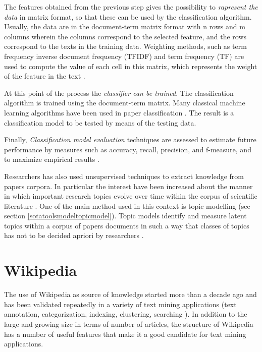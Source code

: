 \documentclass[]{book}
\begin{document}
The features obtained from the previous step gives the possibility to
\emph{rapresent the data} in matrix format, so that these can be used by
the classification algorithm. Usually, the data are in the document-term
matrix format with n rows and m columns wherein the columns correspond
to the selected feature, and the rows correspond to the texts in the
training data. Weighting methods, such as term frequency inverse
document frequency (TFIDF) and term frequency (TF) are used to compute
the value of each cell in this matrix, which represents the weight of
the feature in the text \citep{meyer2008text}.

At this point of the process the \emph{classifier can be trained}. The
classification algorithm is trained using the document-term matrix. Many
classical machine learning algorithms have been used in paper
classification
\citep{hotho2005brief, aphinyanaphongs2003text, zhao2012r}. The result
is a classification model to be tested by means of the testing data.

Finally, \emph{Classification model evaluation} techniques are assessed
to estimate future performance by measures such as accuracy, recall,
precision, and f-measure, and to maximize empirical results
\citep{weiss2015fundamentals}.

Researchers has also used unsupervised techniques to extract knowledge
from papers corpora. In particular the interest have been increased
about the manner in which important research topics evolve over time
within the corpus of scientific literature \citep{zhou2017topic}. One of
the main method used in this context is topic modelling (see section
\ref{sotatoolsmodeltopicmodel}). Topic models identify and measure
latent topics within a corpus of papers documents
\citep{seaghdha2014unsupervised} in such a way that classes of topics
has not to be decided apriori by researchers
\citep{gargiulo2017deep, yang2016discriminative, paraschiv2015semantic}.

\section{Wikipedia}\label{sotadocumentswiki}

The use of Wikipedia as source of knowledge started more than a decade
ago and has been validated repeatedly in a variety of text mining
applications (text annotation, categorization, indexing, clustering,
searching \citep{milne2008learning}). In addition to the large and
growing size in terms of number of articles, the structure of Wikipedia
has a number of useful features that make it a good candidate for text
mining applications.
\end{document}
